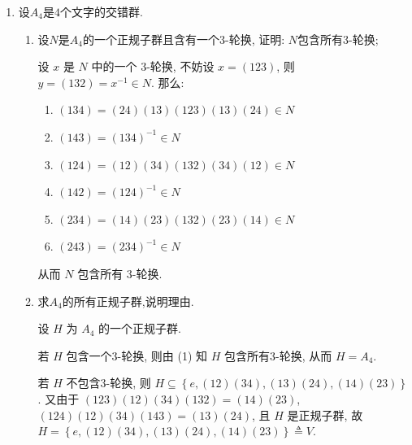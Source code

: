 \begin{enumerate}
\begin{enumerate}[label=(\arabic*)]
\item $\langle (12)(35), (12345) \rangle$.
\begin{solution}
    将 $1,2,3,4,5$ 视为正五边形的五个顶点,
    则 $(12345)$ 对应于顺时针旋转 $72^\circ$,
    $(12)(35)$ 对应于关于过 $4$ 的对称轴反射,
    故 $\langle (12)(35), (12345) \rangle \cong D_5$. 
\end{solution}

\end{enumerate}

\item 设$A_{4}$是$4$个文字的交错群.
\begin{enumerate}[label=(\arabic*)]
\item 设$N$是$A_{4}$的一个正规子群且含有一个$3$-轮换, 证明: $N$包含所有$3$-轮换;
\begin{solution}
    设 $x$ 是 $N$ 中的一个 $3$-轮换, 不妨设 $x=(123)$,
    则 $y=(132)=x^{-1}\in N$. 那么:
    \begin{enumerate}
        \item[]$(134)=(24)(13)(123)(13)(24) \in N$
        \item[]$(143)=(134)^{-1} \in N$
        \item[]$(124)=(12)(34)(132)(34)(12) \in N$
        \item[]$(142)=(124)^{-1} \in N$
        \item[]$(234)=(14)(23)(132)(23)(14) \in N$
        \item[]$(243)=(234)^{-1} \in N$
    \end{enumerate}
    从而 $N$ 包含所有 $3$-轮换. 
\end{solution}

\item 求$A_{4}$的所有正规子群,说明理由.
\begin{solution}
    设 $H$ 为 $A_4$ 的一个正规子群. 

    若 $H$ 包含一个$3$-轮换, 则由 (1) 知 $H$ 包含所有$3$-轮换,
    从而 $H=A_4$. 

    若 $H$ 不包含$3$-轮换,
    则 $H\subseteq\left\{ e,(12)(34),(13)(24),(14)(23) \right\}$.
    又由于 $(123)(12)(34)(132)=(14)(23)$, $(124)(12)(34)(143)=(13)(24)$,
    且 $H$ 是正规子群,
    故 $H=\left\{ e,(12)(34),(13)(24),(14)(23) \right\}\triangleq V$. 


\end{solution}
\end{enumerate}
\end{enumerate}
